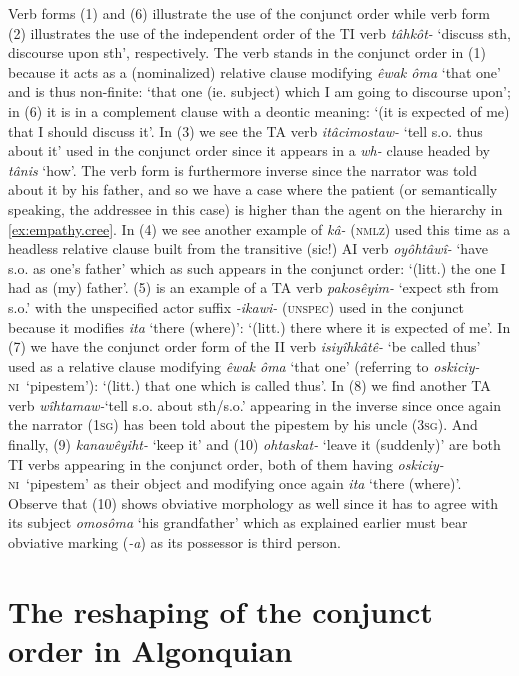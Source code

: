 \documentclass[twoside,a4paper,11pt]{article}
\newcommand{\ipa}[1]{{\phon\textit{#1}}}
\newcommand{\sg}{\textsc{sg}}
\newcommand{\Σ}{\greek{Σ}}
\newcommand{\ninan}{\textsc{ni}}
\newcommand{\nmlz}{\textsc{nmlz}}
\newcommand{\unspec}{\textsc{unspec}}
\begin{document}
Verb forms (1) and (6) illustrate the use of the conjunct order while verb form (2) illustrates the use of the independent order of the TI verb \textit{tâhkôt-} `discuss sth, discourse upon sth', respectively. The verb stands in the conjunct order in (1) because it acts as a (nominalized) relative clause modifying \ipa{êwak ôma} `that one' and is thus non-finite: `that one (ie. subject) which I am going to discourse upon'; in (6) it is in a complement clause with a deontic meaning: `(it is expected of me) that I should discuss it'. In (3) we see the TA verb \ipa{itâcimostaw-} `tell s.o. thus about it' used in the conjunct order since it appears in a \textit{wh-} clause headed by \ipa{tânis} `how'. The verb form is furthermore inverse since the narrator was told about it by his father, and so we have a case where the patient (or semantically speaking, the addressee in this case) is higher than the agent on the hierarchy in \ref{ex:empathy.cree}. In (4) we see another example of \ipa{kâ-} (\nmlz) used this time as a headless relative clause built from the transitive (sic!) AI verb \ipa{oyôhtâwî-} `have s.o. as one's father' which as such appears in the conjunct order: `(litt.) the one I had as (my) father'. (5) is an example of a TA verb \ipa{pakosêyim-} `expect sth from s.o.' with the unspecified actor suffix \ipa{-ikawi-} (\unspec) used in the conjunct because it modifies \ipa{ita} `there (where)': `(litt.) there where it is expected of me'. In (7) we have the conjunct order form of the II verb \ipa{isiyîhkâtê-} `be called thus' used as a relative clause modifying \ipa{êwak ôma} `that one' (referring to  \ipa{oskiciy-} \ninan\ `pipestem'): `(litt.) that one which is called thus'. In (8) we find another TA verb \ipa{wîhtamaw-}`tell s.o. about sth/s.o.' appearing in the inverse since once again the narrator (1\sg) has been told about the pipestem by his uncle (3\sg). And finally, (9) \ipa{kanawêyiht-} `keep it' and (10) \ipa{ohtaskat-} `leave it (suddenly)' are both TI verbs appearing in the conjunct order, both of them having \ipa{oskiciy-} \ninan\ `pipestem' as their object and modifying once again \ipa{ita} `there (where)'. Observe that (10) shows obviative morphology as well since it has to agree with its subject \ipa{omosôma} `his grandfather' which as explained earlier must bear obviative marking (\ipa{-a}) as its possessor is third person.


\section{The reshaping of the conjunct order in Algonquian}
\end{document}
